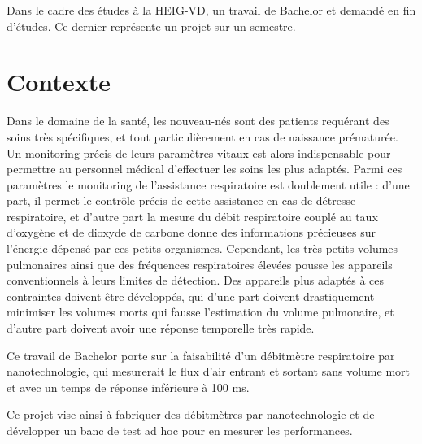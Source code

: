Dans le cadre des études à la HEIG-VD, un travail de Bachelor et demandé en fin d'études. Ce dernier représente un projet sur un semestre. 

\section{Contexte}
Dans le domaine de la santé, les nouveau-nés sont des patients requérant des soins très spécifiques, et tout particulièrement en cas de 
naissance prématurée. Un monitoring précis de leurs paramètres vitaux est alors indispensable pour permettre au personnel médical d'effectuer 
les soins les plus adaptés. Parmi ces paramètres le monitoring de l'assistance respiratoire est doublement utile : d'une part, il permet le 
contrôle précis de cette assistance en cas de détresse respiratoire, et d'autre part la mesure du débit respiratoire couplé au taux d'oxygène 
et de dioxyde de carbone donne des informations précieuses sur l'énergie dépensé par ces petits organismes. Cependant, les très petits volumes 
pulmonaires ainsi que des fréquences respiratoires élevées pousse les appareils conventionnels à leurs limites de détection. Des appareils plus 
adaptés à ces contraintes doivent être développés, qui d'une part doivent drastiquement minimiser les volumes morts qui fausse l'estimation du 
volume pulmonaire, et d'autre part doivent avoir une réponse temporelle très rapide. 

Ce travail de Bachelor porte sur la faisabilité d'un débitmètre respiratoire par nanotechnologie, qui mesurerait le flux d'air entrant et 
sortant sans volume mort et avec un temps de réponse inférieure à 100 ms. 

Ce projet vise ainsi à fabriquer des débitmètres par nanotechnologie et de développer un banc de test ad hoc pour en mesurer les performances.  

